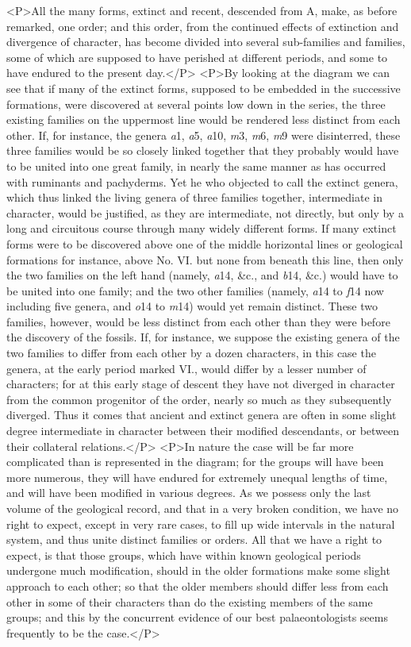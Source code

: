 <P>All the many forms, extinct and recent, descended from A, make, as before remarked, one order; and this order, from the continued effects of extinction and divergence of character, has become divided into several sub-families and families, some of which are supposed to have perished at different periods, and some to have endured to the present day.</P>
<P>By looking at the diagram we can see that if many of the extinct forms, supposed to be embedded in the successive formations, were discovered at several points low down in the series, the three existing families on the uppermost line would be rendered less distinct from each other. If, for instance, the genera \emph{a}1, \emph{a}5, \emph{a}10, \emph{m}3, \emph{m}6, \emph{m}9 were disinterred, these three families would be so closely linked together that they probably would have to be united into one great family, in nearly the same manner as has occurred with ruminants and pachyderms. Yet he who objected to call the extinct genera, which thus linked the living genera of three families together, intermediate in character, would be justified, as they are intermediate, not directly, but only by a long and circuitous course through many widely different forms. If many extinct forms were to be discovered above one of the middle horizontal lines or geological formations for instance, above No.  VI.  but none from beneath this line, then only the two families on the left hand (namely, \emph{a}14, \&c., and \emph{b}14, \&c.) would have to be united into one family; and the two other families (namely, \emph{a}14 to \emph{f}14 now including five genera, and \emph{o}14 to \emph{m}14) would yet remain distinct.  These two families, however, would be less distinct from each other than they were before the discovery of the fossils. If, for instance, we suppose the existing genera of the two families to differ from each other by a dozen characters, in this case the genera, at the early period marked VI., would differ by a lesser number of characters; for at this early stage of descent they have not diverged in character from the common progenitor of the order, nearly so much as they subsequently diverged. Thus it comes that ancient and extinct genera are often in some slight degree intermediate in character between their modified descendants, or between their collateral relations.</P>
<P>In nature the case will be far more complicated than is represented in the diagram; for the groups will have been more numerous, they will have endured for extremely unequal lengths of time, and will have been modified in various degrees. As we possess only the last volume of the geological record, and that in a very broken condition, we have no right to expect, except in very rare cases, to fill up wide intervals in the natural system, and thus unite distinct families or orders. All that we have a right to expect, is that those groups, which have within known geological periods undergone much modification, should in the older formations make some slight approach to each other; so that the older members should differ less from each other in some of their characters than do the existing members of the same groups; and this by the concurrent evidence of our best palaeontologists seems frequently to be the case.</P>
